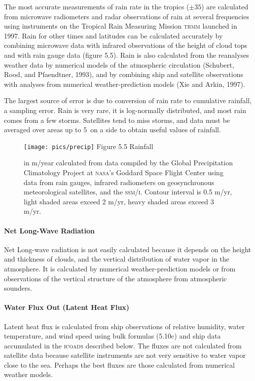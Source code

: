The most accurate measurements of rain rate in the tropics
($\pm 35$\degrees) are calculated from microwave radiometers and radar
observations of rain at several frequencies using instruments on the
Tropical Rain Measuring Mission \textsc{trmm} launched in 1997. Rain
for other times and latitudes can be calculated accurately by
combining microwave data with infrared observations of the height of
cloud tops and with rain gauge data (figure 5.5). Rain is also
calculated from the reanalyses weather data by numerical models of the
atmospheric circulation (Schubert, Rood, and Pfaendtner, 1993), and by
combining ship and satellite observations with analyses from numerical
weather-prediction models (Xie and Arkin, 1997).

The largest source of error is due to conversion of rain rate to
cumulative rainfall, a sampling
error. Rain is very rare, it is log-normally
distributed, and most rain comes from a few storms. Satellites tend to
miss storms, and data must be averaged over areas up to 5\degrees\ on
a side to obtain useful values of rainfall.

\begin{figure}[t!]
\texttt{[image: pics/precip]}
\footnotesize Figure 5.5 Rainfall
\rule{0pt}{3ex}in m/year calculated from data compiled by the Global Precipitation Climatology
Project at \textsc{nasa}'s Goddard Space Flight Center using data from
rain gauges, infrared radiometers on geosynchronous meteorological
satellites, and the \textsc{ssm/i}.  Contour interval is 0.5 m/yr,
light shaded areas exceed 2 m/yr, heavy shaded areas exceed 3
m/yr. \label{fig:precip}
\vspace{-4ex}
\end{figure}

\paragraph{Net Long-Wave Radiation}
Net
Long-wave radiation is not easily calculated because it depends on the
height and thickness of clouds, and the vertical distribution of water
vapor in the atmosphere. It is calculated by numerical
weather-prediction models or from observations of the vertical
structure of the atmosphere from atmospheric sounders.

\paragraph{Water Flux Out (Latent Heat Flux)}
 Latent heat flux is calculated from ship
observations of relative humidity, water temperature, and wind speed
using bulk formulas (5.10c) and ship data accumulated in the
\textsc{icoads} described below. The fluxes are not
calculated from satellite data because satellite instruments are not
very sensitive to water vapor close to the sea. Perhaps the best
fluxes are those calculated from numerical weather models.

